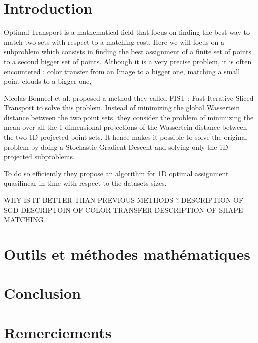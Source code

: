 \documentclass[a4paper,12pt]{article}
\begin{document}

\bigskip

\section*{Introduction}

Optimal Transport is a mathematical field that focus on finding the best way to match two sets with respect to a matching cost. Here we will focus on a subproblem which consists in finding the best assignment of a finite set of points to a second bigger set of points. Although it is a very precise problem, it is often encountered : color transfer from an Image to a bigger one, matching a small point clouds to a bigger one,

Nicolas Bonneel et al. proposed a method they called FIST : Fast Iterative Sliced Transport to solve this problem. Instead of minimizing the global Wassertein distance between the two point sets, they consider the problem of minimizing the mean over all the 1 dimensional projections of the Wassertein distance between the two 1D projected point sets. It hence makes it possible to solve the original problem by doing a Stochastic Gradient Descent and solving only the 1D projected subproblems.

To do so efficiently they propose an algorithm for 1D optimal assignment quasilinear in time with respect to the datasets sizes.

WHY IS IT BETTER THAN PREVIOUS METHODS ?
DESCRIPTION OF SGD
DESCRIPTOIN OF COLOR TRANSFER
DESCRIPTION OF SHAPE MATCHING


\newpage

\section{Outils et méthodes mathématiques}
        

\bigskip

\section*{Conclusion}


\section*{Remerciements}




\end{document}

